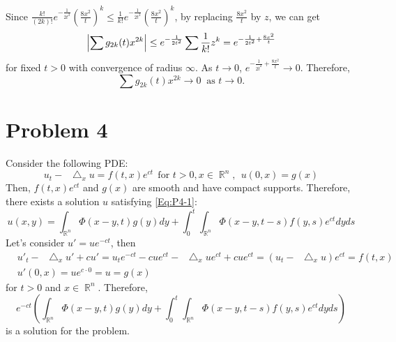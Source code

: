 \documentclass{article}
\DeclareMathOperator{\rr}{\mathbb{R}}
\newcommand*\Laplace{\mathop{}\!\mathbin\bigtriangleup}
\begin{document}
\begin{enumerate}
Since $\frac{k!}{(2k)!}e^{-\frac{1}{2t^2}}\left(\frac{8x^2}{t}\right)^k\leq \frac{1}{k!}e^{-\frac{1}{2t^2}}\left(\frac{8x^2}{t}\right)^k$, by replacing $\frac{8x^2}{t}$ by $z$, we can get
\begin{equation*}
\abs{\sum g_{2k}(t)x^{2k}}\leq e^{-\frac{1}{2t^2}}\sum\frac{1}{k!}z^k=e^{-\frac{1}{2t^2}+\frac{8x^2}{t}}
\end{equation*}
for fixed $t>0$ with convergence of radius $\infty$. As $t\rightarrow 0$, $e^{-\frac{1}{2t^2}+\frac{8x^2}{t}}\rightarrow 0$. Therefore, 
\begin{equation*}
\sum g_{2k}(t)x^{2k}\rightarrow 0 ~\text{ as }t\rightarrow 0.
\end{equation*}
\end{enumerate}

\section*{Problem 4}
Consider the following PDE:
\begin{equation}\label{Eq:P4-1}
u_t-\Laplace_x u=f(t,x)e^{ct}~~\text{for }t>0,x\in\rr^n,~~u(0,x)=g(x)
\end{equation}
Then, $f(t,x)e^{ct}$ and $g(x)$ are smooth and have compact supports. Therefore, there exists a solution $u$ satisfying \eqref{Eq:P4-1}:
\begin{equation*}
u(x,y)=\int_{\rr^n}\Phi(x-y,t)g(y)dy+\int_0^t\int_{\rr^n}\Phi(x-y,t-s)f(y,s)e^{ct}dyds
\end{equation*}
Let's consider $u'=ue^{-ct}$, then
\begin{equation*}
\begin{split}
&u'_t-\Laplace_x u'+cu'=u_te^{-ct}-cue^{ct}-\Laplace_x ue^{ct}+cue^{ct}=(u_t-\Laplace_x u)e^{ct}=f(t,x) \\
&u'(0,x)=ue^{c\cdot 0}=u=g(x)
\end{split}
\end{equation*}
for $t>0$ and $x\in \rr^n$. Therefore, 
\begin{equation*}
e^{-ct}\left(\int_{\rr^n}\Phi(x-y,t)g(y)dy+\int_0^t\int_{\rr^n}\Phi(x-y,t-s)f(y,s)e^{ct}dyds\right)
\end{equation*}
is a solution for the problem.
\end{document}
